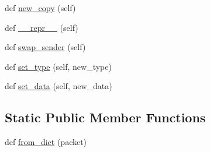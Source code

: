 \begin{DoxyCompactItemize}
\item 
def \hyperlink{classparlai_1_1mturk_1_1core_1_1dev_1_1socket__manager_1_1Packet_adde61fc0d58a62c2446fe8ea54adb02e}{new\+\_\+copy} (self)
\item 
def \hyperlink{classparlai_1_1mturk_1_1core_1_1dev_1_1socket__manager_1_1Packet_add796297ba2304710fade256bf5e0adf}{\+\_\+\+\_\+repr\+\_\+\+\_\+} (self)
\item 
def \hyperlink{classparlai_1_1mturk_1_1core_1_1dev_1_1socket__manager_1_1Packet_a52713ae6c40a1c3ef54c309baee5f092}{swap\+\_\+sender} (self)
\item 
def \hyperlink{classparlai_1_1mturk_1_1core_1_1dev_1_1socket__manager_1_1Packet_afd43b3b84a5266bd3aaedc63a304e5a8}{set\+\_\+type} (self, new\+\_\+type)
\item 
def \hyperlink{classparlai_1_1mturk_1_1core_1_1dev_1_1socket__manager_1_1Packet_a73e956631f9f7da69ec03301147f8517}{set\+\_\+data} (self, new\+\_\+data)
\end{DoxyCompactItemize}
\subsection*{Static Public Member Functions}
\begin{DoxyCompactItemize}
\item 
def \hyperlink{classparlai_1_1mturk_1_1core_1_1dev_1_1socket__manager_1_1Packet_a02cdee81b0dbf9f893da7f288eadf1ea}{from\+\_\+dict} (packet)
\end{DoxyCompactItemize}
